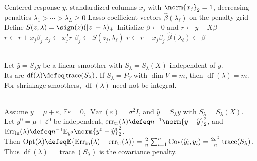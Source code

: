 \begin{breakablealgorithm}
\caption{Pathwise Coordinate Descent for the Lasso}
\label{alg:lasso-pathwise-coordinate-descent}
\begin{algorithmic}
\Require Centered response $y$, standardized columns $x_j$ with $\norm{x_j}_2=1$, decreasing penalties $\lambda_1>\cdots>\lambda_L\geq0$
\Ensure Lasso coefficient vectors $\widehat{\beta}(\lambda_\ell)$ on the penalty grid
\State Define $S(z,\lambda)=\sign(z)(|z|-\lambda)_+$
\State Initialize $\beta\gets0$ and $r\gets y-X\beta$
\Repeat
{}
\State $r\gets r+x_j\beta_j$
\State $z_j\gets x_j^Tr$
\State $\beta_j\gets S(z_j,\lambda_\ell)$
\State $r\gets r-x_j\beta_j$
\EndFor
{}
\State $\widehat{\beta}(\lambda_\ell)\gets\beta$
\EndFor
\end{algorithmic}
\end{breakablealgorithm}

\begin{definition} \label{def:sl-effective-degrees-of-freedom} \\
Let $\widehat{y}=S_\lambda y$ be a linear smoother with $S_\lambda=S_\lambda(X)$ independent of $y$.\\
Its  are $\operatorname{df}(\lambda)\defeq\operatorname{trace}(S_\lambda)$. If $S_\lambda=P_V$ with $\dim V=m$, then $\operatorname{df}(\lambda)=m$.\\
For shrinkage smoothers, $\operatorname{df}(\lambda)$ need not be integral.
\end{definition}

\begin{remark} \label{rem:sl-training-error-optimism} \\
Assume $y=\mu+\varepsilon$, $\mathbb{E}\varepsilon=0$, $\operatorname{Var}(\varepsilon)=\sigma^2I$, and $\widehat{y}=S_\lambda y$ with $S_\lambda=S_\lambda(X)$.\\
Let $y^0=\mu+\varepsilon^0$ be independent, $\operatorname{err}_{\mathrm{tr}}(\lambda)\defeq n^{-1}\norm{y-\widehat{y}}_2^2$, and $\operatorname{Err}_{\mathrm{in}}(\lambda)\defeq n^{-1}\mathbb{E}_{y^0}\norm{y^0-\widehat{y}}_2^2$.\\
Then $\operatorname{Opt}(\lambda)\defeq\mathbb{E}\{\operatorname{Err}_{\mathrm{in}}(\lambda)-\operatorname{err}_{\mathrm{tr}}(\lambda)\}=\frac{2}{n}\sum_{i=1}^n\operatorname{Cov}(\widehat{y}_i,y_i)=\frac{2\sigma^2}{n}\operatorname{trace}(S_\lambda)$.\\
Thus $\operatorname{df}(\lambda)=\operatorname{trace}(S_\lambda)$ is the covariance penalty.
\end{remark}


